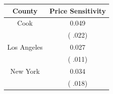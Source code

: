 
\centering
\begin{tabular}[t]{cc}
\toprule
County & Price Sensitivity\\
\midrule
Cook & 0.049\\
 & (   .022)\\
Los Angeles & 0.027\\
 & (   .011)\\
New York & 0.034\\
 & (   .018)\\
\bottomrule
\end{tabular}